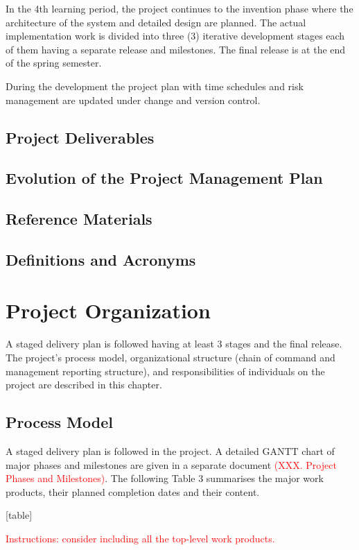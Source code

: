 \documentclass{article}
\begin{document}
In the 4th learning period, the project continues to the invention phase where the
architecture of the system and detailed design are planned. The actual
implementation work is divided into three (3) iterative development stages each
of them having a separate release and milestones. The final release is at the end
of the spring semester.

During the development the project plan with time schedules and risk
management are updated under change and version control.


\subsection{Project Deliverables}
\subsection{Evolution of the Project Management Plan}
\subsection{Reference Materials}
\subsection{Definitions and Acronyms}

\section{Project Organization}
A staged delivery plan is followed having at least 3 stages and the final release.
The project’s process model, organizational structure (chain of command and
management reporting structure), and responsibilities of individuals on the project
are described in this chapter.



\subsection{Process Model}
A staged delivery plan is followed in the project. A detailed GANTT chart of major
phases and milestones are given in a separate document \textcolor{red}{(XXX. Project Phases
and Milestones)}. The following Table 3 summarises the major work products,
their planned completion dates and their content.

[table]

\textcolor{red}{Instructions: consider including all the top-level work products.}
\end{document}
